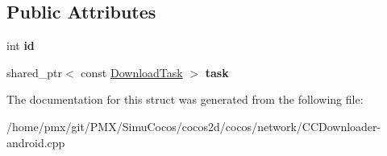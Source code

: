 \subsection*{Public Attributes}
\begin{DoxyCompactItemize}
\item 
\mbox{\label{structcocos2d_1_1network_1_1DownloadTaskAndroid_a23fc90ed817c24dd27452737d8ca1379}} 
int {\bfseries id}
\item 
\mbox{\label{structcocos2d_1_1network_1_1DownloadTaskAndroid_a947ac974097d80741e214c17b6669c2e}} 
shared\+\_\+ptr$<$ const \hyperlink{classcocos2d_1_1network_1_1DownloadTask}{Download\+Task} $>$ {\bfseries task}
\end{DoxyCompactItemize}


The documentation for this struct was generated from the following file\+:\begin{DoxyCompactItemize}
\item 
/home/pmx/git/\+P\+M\+X/\+Simu\+Cocos/cocos2d/cocos/network/C\+C\+Downloader-\/android.\+cpp\end{DoxyCompactItemize}
